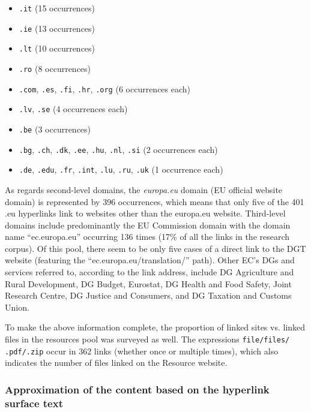 \documentclass[output=paper]{langsci/langscibook}
\begin{document}
\begin{itemize}
 \item \texttt{.it} (15 occurrences)
\item \texttt{.ie} (13 occurrences)
\item \texttt{.lt} (10 occurrences)
\item \texttt{.ro} (8 occurrences)
\item \texttt{.com}, \texttt{.es}, \texttt{.fi}, \texttt{.hr}, \texttt{.org} (6 occurrences each)
\item \texttt{.lv}, \texttt{.se} (4 occurrences each)
\item \texttt{.be} (3 occurrences)
\item \texttt{.bg}, \texttt{.ch}, \texttt{.dk}, \texttt{.ee}, \texttt{.hu}, \texttt{.nl}, \texttt{.si} (2 occurrences each)
\item \texttt{.de}, \texttt{.edu}, \texttt{.fr}, \texttt{.int}, \texttt{.lu}, \texttt{.ru}, \texttt{.uk} (1 occurrence each)

\end{itemize}

As regards second-level domains, the \textit{europa.eu} domain (EU official website domain) is represented by 396 occurrences, which means that only five of the 401 .eu hyperlinks link to websites other than the europa.eu website. Third-level domains include predominantly the EU Commission domain with the domain name “ec.europa.eu” occurring 136 times (17\% of all the links in the research corpus). Of this pool, there seem to be only five cases of a direct link to the DGT website (featuring the “ec.europa.eu/translation/” path). Other EC’s DGs and services referred to, according to the link address, include DG Agriculture and Rural Development, DG Budget, Eurostat, DG Health and Food Safety, Joint Research Centre, DG Justice and Consumers, and DG Taxation and Customs Union.

To make the above information complete, the proportion of linked sites vs. linked files in the resources pool was surveyed as well. The expressions \texttt{file/files/ .pdf/.zip} occur in 362 links (whether once or multiple times), which also indicates the number of files linked on the Resource website. 

\subsubsection{Approximation of the content based on the hyperlink surface text}\label{sec:svoboda:4.4.2}
\end{document}
